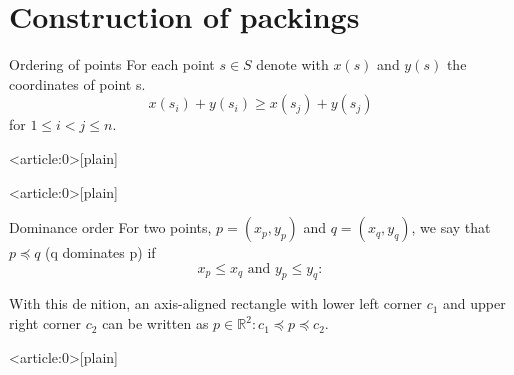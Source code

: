 \section{Construction of packings}
\begin{frame}{Ordering of points}
	For each point $s \in S$ denote with $x(s)$ and $y(s)$ the coordinates of point s.
	\begin{equation*}
		x(s_i) + y(s_i) \geq x(s_j) + y(s_j)
	\end{equation*}
	for $1 \leq i < j \leq n$.
\end{frame}

{ %
    \begin{frame}<article:0>[plain]
     \end{frame}
}

{ %
    \begin{frame}<article:0>[plain]
     \end{frame}
}

\begin{frame}{Dominance order}
	For two points, $p = (x_p, y_p)$ and $q = (x_q, y_q)$, we say that $p \preceq q$ (q dominates p) if
	\begin{equation*}
		x_p \leq x_q \text{ and } y_p \leq y_q:
	\end{equation*}

	With this denition, an axis-aligned rectangle with lower left corner $c_1$ and upper right corner $c_2$ can be written as ${p \in \mathbb{R}^2 : c_1 \preceq p \preceq c_2}$.
\end{frame}

{ %
    \begin{frame}<article:0>[plain]
     \end{frame}
}

